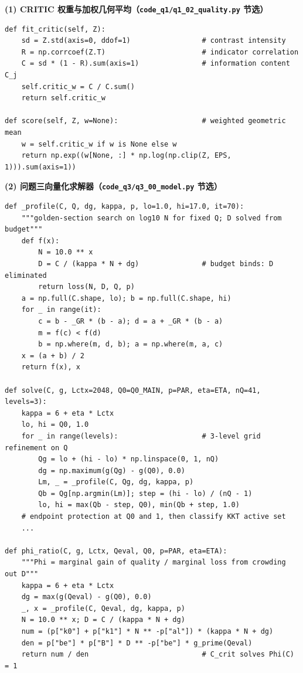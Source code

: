 \textbf{(1) CRITIC 权重与加权几何平均（\texttt{code\_q1/q1\_02\_quality.py} 节选）}
\begin{lstlisting}
def fit_critic(self, Z):
    sd = Z.std(axis=0, ddof=1)                 # contrast intensity
    R = np.corrcoef(Z.T)                       # indicator correlation
    C = sd * (1 - R).sum(axis=1)               # information content C_j
    self.critic_w = C / C.sum()
    return self.critic_w

def score(self, Z, w=None):                    # weighted geometric mean
    w = self.critic_w if w is None else w
    return np.exp((w[None, :] * np.log(np.clip(Z, EPS, 1))).sum(axis=1))
\end{lstlisting}

\textbf{(2) 问题三向量化求解器（\texttt{code\_q3/q3\_00\_model.py} 节选）}
\begin{lstlisting}
def _profile(C, Q, dg, kappa, p, lo=1.0, hi=17.0, it=70):
    """golden-section search on log10 N for fixed Q; D solved from budget"""
    def f(x):
        N = 10.0 ** x
        D = C / (kappa * N + dg)               # budget binds: D eliminated
        return loss(N, D, Q, p)
    a = np.full(C.shape, lo); b = np.full(C.shape, hi)
    for _ in range(it):
        c = b - _GR * (b - a); d = a + _GR * (b - a)
        m = f(c) < f(d)
        b = np.where(m, d, b); a = np.where(m, a, c)
    x = (a + b) / 2
    return f(x), x

def solve(C, g, Lctx=2048, Q0=Q0_MAIN, p=PAR, eta=ETA, nQ=41, levels=3):
    kappa = 6 + eta * Lctx
    lo, hi = Q0, 1.0
    for _ in range(levels):                    # 3-level grid refinement on Q
        Qg = lo + (hi - lo) * np.linspace(0, 1, nQ)
        dg = np.maximum(g(Qg) - g(Q0), 0.0)
        Lm, _ = _profile(C, Qg, dg, kappa, p)
        Qb = Qg[np.argmin(Lm)]; step = (hi - lo) / (nQ - 1)
        lo, hi = max(Qb - step, Q0), min(Qb + step, 1.0)
    # endpoint protection at Q0 and 1, then classify KKT active set
    ...

def phi_ratio(C, g, Lctx, Qeval, Q0, p=PAR, eta=ETA):
    """Phi = marginal gain of quality / marginal loss from crowding out D"""
    kappa = 6 + eta * Lctx
    dg = max(g(Qeval) - g(Q0), 0.0)
    _, x = _profile(C, Qeval, dg, kappa, p)
    N = 10.0 ** x; D = C / (kappa * N + dg)
    num = (p["k0"] + p["k1"] * N ** -p["al"]) * (kappa * N + dg)
    den = p["be"] * p["B"] * D ** -p["be"] * g_prime(Qeval)
    return num / den                           # C_crit solves Phi(C) = 1
\end{lstlisting}


